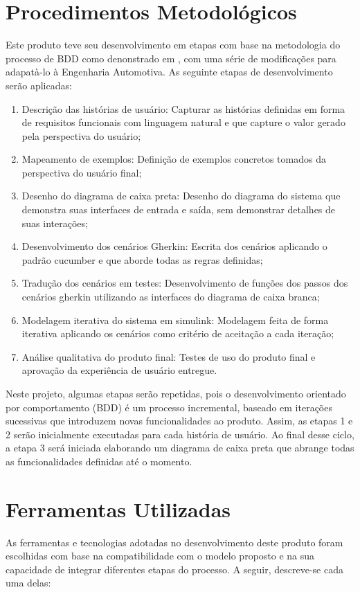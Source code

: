 \section{Procedimentos Metodológicos}
Este produto teve seu desenvolvimento em etapas com base na metodologia do processo de BDD como denonstrado em \cite{studyBDD}, com uma série de modificações 
para adapatà-lo à Engenharia Automotiva. As seguinte etapas de desenvolvimento serão aplicadas:
\begin{enumerate}
    \item Descrição das histórias de usuário: Capturar as histórias definidas em forma de requisitos funcionais com linguagem natural e que capture o valor 
    gerado pela perspectiva do usuário;
    \item Mapeamento de exemplos: Definição de exemplos concretos tomados da perspectiva do usuário final;
    \item Desenho do diagrama de caixa preta: Desenho do diagrama do sistema que demonstra suas interfaces de entrada e saída, sem demonstrar detalhes de suas interações;
    \item Desenvolvimento dos cenários Gherkin: Escrita dos cenários aplicando o padrão cucumber e que aborde todas as regras definidas;
    \item Tradução dos cenários em testes: Desenvolvimento de funções dos passos dos cenários gherkin utilizando as interfaces do diagrama de caixa branca;
    \item Modelagem iterativa do sistema em simulink: Modelagem feita de forma iterativa aplicando os cenários como critério de aceitação a cada iteração;
    \item Análise qualitativa do produto final: Testes de uso do produto final e aprovação da experiência de usuário entregue.
\end{enumerate}

Neste projeto, algumas etapas serão repetidas, pois o desenvolvimento orientado por comportamento (BDD) é um processo incremental, baseado em iterações 
sucessivas que introduzem novas funcionalidades ao produto. Assim, as etapas 1 e 2 serão inicialmente executadas para cada história de usuário. Ao final 
desse ciclo, a etapa 3 será iniciada elaborando um diagrama de caixa preta que abrange todas as funcionalidades definidas até o momento.

\section{Ferramentas Utilizadas}
As ferramentas e tecnologias adotadas no desenvolvimento deste produto foram escolhidas com base na compatibilidade com o modelo proposto e na sua capacidade 
de integrar diferentes etapas do processo. A seguir, descreve-se cada uma delas:

